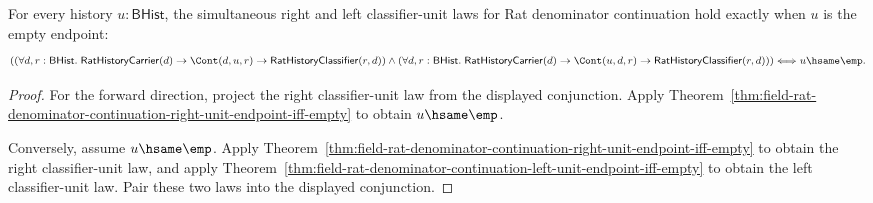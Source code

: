 \begin{theorem}
\label{thm:field-rat-denominator-continuation-two-sided-unit-law-endpoint-empty-iff}
For every history $u:\mathsf{BHist}$, the simultaneous right and left
classifier-unit laws for Rat denominator continuation hold exactly when $u$ is
the empty endpoint:
$$
\left(
  \left(
    \forall d,r:\mathsf{BHist}.\;
    \mathsf{RatHistoryCarrier}(d)\to
    \Cont(d,u,r)\to
    \mathsf{RatHistoryClassifier}(r,d)
  \right)
  \land
  \left(
    \forall d,r:\mathsf{BHist}.\;
    \mathsf{RatHistoryCarrier}(d)\to
    \Cont(u,d,r)\to
    \mathsf{RatHistoryClassifier}(r,d)
  \right)
\right)
\Longleftrightarrow
u\hsame\emp .
$$
\end{theorem}
\begin{proof}
For the forward direction, project the right classifier-unit law from the
displayed conjunction. Apply
Theorem~\ref{thm:field-rat-denominator-continuation-right-unit-endpoint-iff-empty}
to obtain $u\hsame\emp$.

Conversely, assume $u\hsame\emp$. Apply
Theorem~\ref{thm:field-rat-denominator-continuation-right-unit-endpoint-iff-empty}
to obtain the right classifier-unit law, and apply
Theorem~\ref{thm:field-rat-denominator-continuation-left-unit-endpoint-iff-empty}
to obtain the left classifier-unit law. Pair these two laws into the displayed
conjunction.
\end{proof}

